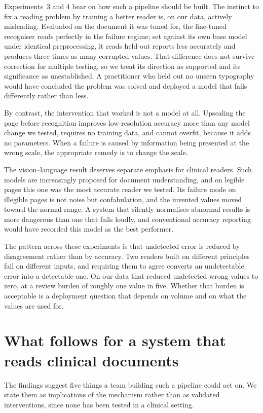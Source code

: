 \documentclass[11pt]{article}
\begin{document}
Experiments~3 and 4 bear on how such a pipeline should be built. The instinct to fix a reading
problem by training a better reader is, on our data, actively misleading. Evaluated on the
document it was tuned for, the fine-tuned recogniser reads perfectly in the failure regime; set
against its own base model under identical preprocessing, it reads held-out reports less
accurately and produces three times as many corrupted values. That difference does not survive
correction for multiple testing, so we treat its direction as supported and its significance as
unestablished. A practitioner who held out no unseen typography would have
concluded the problem was solved and deployed a model that fails differently rather than less.

By contrast, the intervention that worked is not a model at all. Upscaling the page before
recognition improves low-resolution accuracy more than any model change we tested, requires no
training data, and cannot overfit, because it adds no parameters. When a failure is caused by
information being presented at the wrong scale, the appropriate remedy is to change the scale.

The vision--language result deserves separate emphasis for clinical readers. Such models are
increasingly proposed for document understanding, and on legible pages this one was the most
accurate reader we tested. Its failure mode on illegible pages is not noise but confabulation,
and the invented values moved toward the normal range. A system that silently normalises
abnormal results is more dangerous than one that fails loudly, and conventional accuracy
reporting would have recorded this model as the best performer.

The pattern across these experiments is that undetected error is reduced by disagreement rather
than by accuracy. Two readers built on different principles fail on different inputs, and requiring them
to agree converts an undetectable error into a detectable one. On our data that reduced
undetected wrong values to zero, at a review burden of roughly one value in five. Whether that
burden is acceptable is a deployment question that depends on volume and on what the values are
used for.

\section{What follows for a system that reads clinical documents}

The findings suggest five things a team building such a pipeline could act on. We state them as
implications of the mechanism rather than as validated interventions, since none has been tested
in a clinical setting.
\end{document}
